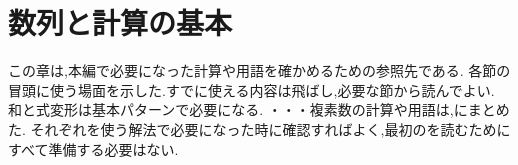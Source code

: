 
\chapter{数列と計算の基本}\label{章：前提知識と計算の基本}\label{章：計算の基本}
\begin{bookcolumns}
  この章は,本編で必要になった計算や用語を確かめるための参照先である.
  各節の冒頭に使う場面を示した.すでに使える内容は飛ばし,必要な節から読んでよい.
  和と式変形は基本パターンで必要になる.
  ・・・複素数の計算や用語は,にまとめた.
  それぞれを使う解法で必要になった時に確認すればよく,最初のを読むためにすべて準備する必要はない.







\end{bookcolumns}
